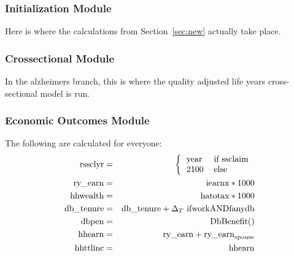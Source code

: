 \documentclass{article}
\begin{document}
\subsubsection{Initialization Module}
Here is where the calculations from Section~\ref{sec:new} actually
take place.

\subsubsection{Crossectional Module}
In the alzheimers branch, this is where the quality adjusted life
years cross-sectional model is run.

\subsubsection{Economic Outcomes Module}
The following are calculated for everyone:
\begin{eqnarray}
{\rm rssclyr} &=& \left\{\begin{tabular}{ll}year&if ssclaim\\2100&else\end{tabular}\right.\\
{\rm ry\_earn} &=& {\rm iearnx} * 1000\\
{\rm hhwealth} &=& {\rm hatotax} * 1000\\
{\rm db\_tenure} &=& {\rm db\_tenure} + \Delta_T ~{\rm if work AND
  fanydb}\\
{\rm dbpen} &=& {\rm DbBenefit}()\\
{\rm hhearn} &=& {\rm ry\_earn} + {\rm ry\_earn}_{\rm spouse}\\
{\rm hhttlinc} &=& {\rm hhearn}
\end{eqnarray}
\end{document}
